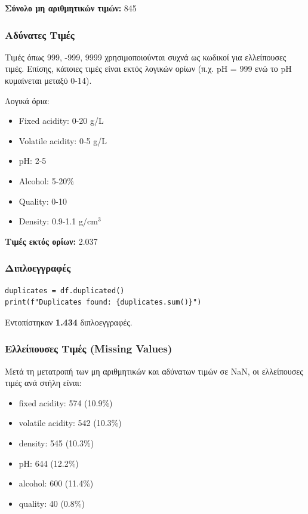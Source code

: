 \documentclass[12pt,a4paper]{article}
\begin{document}
\textbf{Σύνολο μη αριθμητικών τιμών:} 845

\subsubsection{Αδύνατες Τιμές}

Τιμές όπως 999, -999, 9999 χρησιμοποιούνται συχνά ως κωδικοί για ελλείπουσες τιμές. Επίσης, κάποιες τιμές είναι εκτός λογικών ορίων (π.χ. pH = 999 ενώ το pH κυμαίνεται μεταξύ 0-14).

Λογικά όρια:
\begin{itemize}
    \item Fixed acidity: 0-20 g/L
    \item Volatile acidity: 0-5 g/L
    \item pH: 2-5
    \item Alcohol: 5-20\%
    \item Quality: 0-10
    \item Density: 0.9-1.1 g/cm$^3$
\end{itemize}

\textbf{Τιμές εκτός ορίων:} 2.037

\subsubsection{Διπλοεγγραφές}

\begin{lstlisting}
duplicates = df.duplicated()
print(f"Duplicates found: {duplicates.sum()}")
\end{lstlisting}

Εντοπίστηκαν \textbf{1.434} διπλοεγγραφές.

\subsubsection{Ελλείπουσες Τιμές (Missing Values)}

Μετά τη μετατροπή των μη αριθμητικών και αδύνατων τιμών σε NaN, οι ελλείπουσες τιμές ανά στήλη είναι:

\begin{itemize}
    \item fixed acidity: 574 (10.9\%)
    \item volatile acidity: 542 (10.3\%)
    \item density: 545 (10.3\%)
    \item pH: 644 (12.2\%)
    \item alcohol: 600 (11.4\%)
    \item quality: 40 (0.8\%)
\end{itemize}
\end{document}
